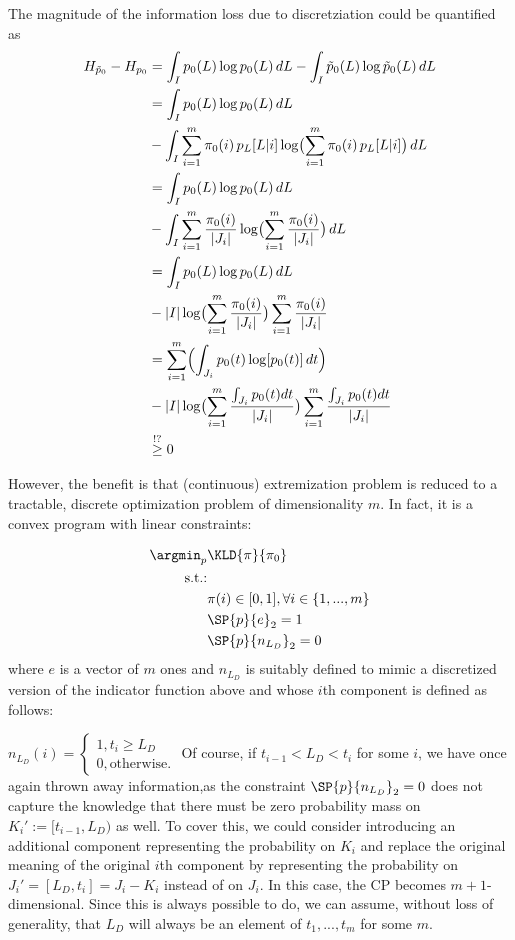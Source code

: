 The magnitude of the information loss due to discretziation could be quantified as 
\begin{align*}
 H_{\tilde p_0}-H_{ p_0}  &=\int_I p_0(L) \log p_0(L) \, dL  - \int_I \tilde p_0(L)    \log  \tilde p_0(L) \, dL \\
& = \int_I p_0(L) \log p_0(L) \, dL  \\
&- \int_I\sum_{i=1}^m \pi_0(i) \, p_L [L| i ]    \log \bigl(\sum_{i=1}^m \pi_0(i) \, p_L [L| i ]\bigr) \, dL \\
& = \int_I p_0(L) \log p_0(L) \, dL  \\
&- \int_I\sum_{i=1}^m \frac{\pi_0(i)}{|J_i|}     \log \bigl(\sum_{i=1}^m \frac{\pi_0(i)}{|J_i|} \bigr) \, dL \\
& = \int_I p_0(L) \log p_0(L) \, dL  \\
&- |I|  \log \bigl(\sum_{i=1}^m \frac{\pi_0(i)}{|J_i|} \bigr) \sum_{i=1}^m \frac{\pi_0(i)}{|J_i|}     \\
& =  \sum_{i=1}^m \Bigl(\int_{J_i} p_0(t) \log [p_0(t)] \, dt \Bigr)   \\
&- |I|  \log \bigl(\sum_{i=1}^m \frac{\int_{J_i} p_0(t) dt}{|J_i|} \bigr) \sum_{i=1}^m \frac{\int_{J_i} p_0(t) dt}{|J_i|}     \\
& \stackrel{!?} {\geq }0
\end{align*}

 
However, the benefit is that (continuous) extremization problem is reduced to a tractable, discrete optimization problem of dimensionality $m$. In fact, it is a convex program with linear constraints:

\begin{align}
\argmin_p & \KLD {\pi}{\pi_0}\\
\text{s.t.:}&\\
& \pi(i) \in [0,1], \forall i \in\{1,...,m\}\\
&\SP{p}{e}_{2} =1\\
& \SP{p}{n_{L_D}}_{2} =0
\end{align}
where $e$ is a vector of $m$ ones and $n_{L_D}$ is suitably defined to mimic a discretized version of the indicator function above and whose $i$th component is defined as follows:

$n_{L_D} (i) = \begin{cases} 1, t_i \geq L_D\\ 0, \text{otherwise.} \end{cases}$ Of course, if $t_{i-1} < L_D < t_i$ for some $i$, we have once again thrown away information,as the constraint $\SP{p}{n_{L_D}}_{2} =0$ does not capture the knowledge that there must be zero probability mass on $K_i' := [t_{i-1},L_D)$ as well. To cover this, we could consider 
introducing an additional component representing the probability on $K_i$  and replace the original meaning of the original $i$th component by representing the probability on  $J_i' = [L_D, t_i] =J_i - K_i$ instead of on $J_i$. In this case, the CP becomes $m+1$-dimensional. Since this is always possible to do, we can assume, without loss of generality, that $L_D $ will always be an element of $t_1,...,t_m$ for some $m$.


